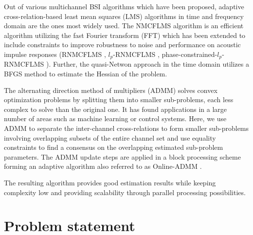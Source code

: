 \documentclass{article}
\begin{document}
\noindent Out of various multichannel BSI algorithms which have been proposed, adaptive cross-relation-based least mean squares (LMS) algorithms in time and frequency domain \cite{huangAdaptiveMultichannelLeast2002,huangClassFrequencydomainAdaptive2003} are the ones most widely used.
The NMCFLMS algorithm is an efficient algorithm utilizing the fast Fourier transform (FFT) which has been extended to include constraints to improve robustness to noise and performance on acoustic impulse responses (RNMCFLMS \cite{huNoiseRobustBlind2015}, \(l_p\)-RNMCFLMS \cite{heNoiseRobustFrequencyDomain2018}, phase-constrained-\(l_p\)-RNMCFLMS \cite{joRobustBlindMultichannel2021}).
Further, the quasi-Netwon \cite{habetsOnlineQuasiNewtonAlgorithm2010} approach in the time domain utilizes a BFGS method to estimate the Hessian of the problem.

The alternating direction method of multipliers (ADMM) \cite{boydDistributedOptimizationStatistical2011} solves convex optimization problems by splitting them into smaller sub-problems, each less complex to solve than the original one.
It has found applications in a large number of areas such as machine learning or control systems.
Here, we use ADMM to separate the inter-channel cross-relations to form smaller sub-problems involving overlapping subsets of the entire channel set and use equality constraints to find a consensus on the overlapping estimated sub-problem parameters.
The ADMM update steps are applied in a block processing scheme forming an adaptive algorithm also referred to as Online-ADMM \cite{wangOnlineAlternatingDirection2013,hosseiniOnlineDistributedADMM2014}.

The resulting algorithm provides good estimation results while keeping complexity low and providing scalability through parallel processing possibilities.



\section{Problem statement}
\label{sec:problem_statement}


\end{document}
